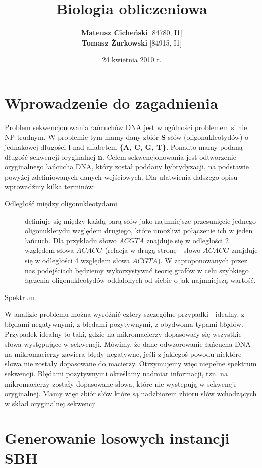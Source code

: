 \documentclass[a4paper,10pt]{article}
\title{\textbf{Biologia obliczeniowa}}
\author{\textbf{Mateusz Cicheński} [84780, I1]\\ \textbf{Tomasz Żurkowski} [84915, I1]}
\date{24 kwietnia 2010 r.}
\begin{document}
 
\maketitle

\tableofcontents

\newpage

\section{Wprowadzenie do zagadnienia}

Problem sekwencjonowania łańcuchów DNA jest w ogólności problemem silnie NP-trudnym. W problemie tym mamy dany zbiór {\bf S} słów (oligonukleotydów) o jednakowej długości {\bf l} nad alfabetem {\bf \{A, C, G, T\}}. Ponadto mamy podaną długość sekwencji oryginalnej {\bf n}. Celem sekwencjonowania jest odtworzenie oryginalnego łańcucha DNA, który został poddany hybrydyzacji, na podstawie powyżej zdefiniowanych danych wejściowych.
Dla ułatwienia dalszego opisu wprowadźmy kilka terminów: 
\begin{description}
  \item[Odległość między oligonukleotydami] definiuje się między każdą parą słów jako najmniejsze przesunięcie jednego oligonukletydu względem drugiego, które umożliwi połączenie ich w jeden łańcuch. Dla przykładu słowo $ACGTA$ znajduje się w odległości 2 względem słowa $ACACG$ (relacja w drugą stronę - słowo $ACACG$ znajduje się w odległości 4 względem słowa $ACGTA$).
W zaproponowanych przez nas podejściach będziemy wykorzystywać teorię grafów w celu szybkiego łączenia oligonukleotydów oddalonych od siebie o jak najmniejszą wartość.
  \item[Spektrum] %
\end{description}
W analizie problemu można wyróżnić cztery szczególne przypadki - idealny, z błędami negatywnymi, z błędami pozytywnymi, z obydwoma typami błędów.
Przypadek idealny to taki, gdzie na mikromacierzy dopasowały się wszystkie słowa występujące w sekwencji.
Mówimy, że dane odwzorowanie łańcucha DNA na mikromacierzy zawiera błędy negatywne, jeśli z jakiegoś powodu niektóre słowa nie zostały dopasowane do macierzy. Otrzymujemy więc niepełne spektrum sekwencji.
Błędami pozytywnymi określamy nadmiar informacji, tzn. na mikromacierzy zostały dopasowane słowa, które nie występują w sekwencji oryginalnej. Mamy więc zbiór słów które są nadzbiorem zbioru słów wchodzących w skład oryginalnej sekwencji.

\section{Generowanie losowych instancji SBH}
\end{document}
